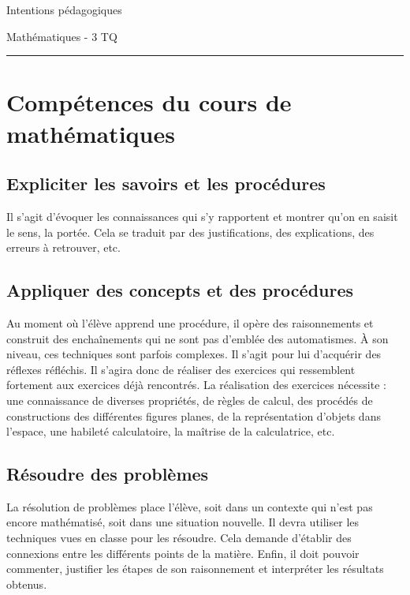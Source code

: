 \documentclass[parskip=half-, numbers=enddot]{scrartcl}
\begin{document}
\begin{center}
    \bfseries
    \begin{Huge}
        Intentions pédagogiques
    \end{Huge}
    \smallbreak
    \begin{Large}
        Mathématiques - 3 TQ
    \end{Large}
    \smallbreak
    \rule[10pt]{.3\linewidth}{1 pt}
\end{center}
\section{Compétences du cours de mathématiques}

\subsection{Expliciter les savoirs et les procédures}

Il s'agit d'évoquer les connaissances qui s'y rapportent et montrer
qu'on en saisit le sens, la portée. Cela se traduit par des
justifications, des explications, des erreurs à retrouver, etc.

\subsection{Appliquer des concepts et des procédures}

Au moment où l'élève apprend une procédure, il opère des raisonnements
et construit des enchaînements qui ne sont pas d'emblée des
automatismes. À son niveau, ces techniques sont parfois complexes. Il
s'agit pour lui d'acquérir des réflexes réfléchis. Il s'agira donc de
réaliser des exercices qui ressemblent fortement aux exercices déjà
rencontrés. La réalisation des exercices nécessite : une connaissance de
diverses propriétés, de règles de calcul, des procédés de constructions
des différentes figures planes, de la représentation d'objets dans
l'espace, une habileté calculatoire, la maîtrise de la
calculatrice, etc.

\subsection{Résoudre des problèmes}

La résolution de problèmes place l'élève, soit dans un contexte qui
n'est pas encore mathématisé, soit dans une situation nouvelle. Il devra
utiliser les techniques vues en classe pour les résoudre. Cela demande
d'établir des connexions entre les différents points de la matière.
Enfin, il doit pouvoir commenter, justifier les étapes de son
raisonnement et interpréter les résultats obtenus.
\end{document}
